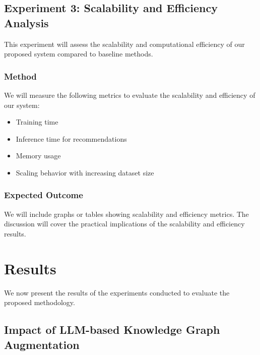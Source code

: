 \documentclass{article}
\begin{document}

\subsection{Experiment 3: Scalability and Efficiency Analysis}

This experiment will assess the scalability and computational efficiency of our
proposed system compared to baseline methods.

\subsubsection{Method}
We will measure the following metrics to evaluate the scalability and
efficiency of our system:
\begin{itemize}
      \item Training time
      \item Inference time for recommendations
      \item Memory usage
      \item Scaling behavior with increasing dataset size
\end{itemize}

\subsubsection{Expected Outcome}
We will include graphs or tables showing scalability and efficiency metrics.
The discussion will cover the practical implications of the scalability and
efficiency results.


\section {Results}
We now present the results of the experiments conducted to evaluate the
proposed methodology.

\subsection{Impact of LLM-based Knowledge Graph Augmentation}
\end{document}
